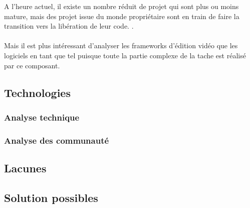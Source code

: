       A l'heure actuel, il existe un nombre réduit de projet qui sont
      plus ou moins mature, mais des projet issue du monde propriétaire
      sont en train de faire la transition vers la libération de leur
      code. \cite{XXXXXXXXX}.

    \paragraph{}
      Mais il est plus intéressant d'analyser les frameworks d'édition
      vidéo  que les logiciels en tant que tel puisque toute la partie
      complexe de la tache est réalisé par ce composant.

  \subsection{Technologies}
    \subsubsection{Analyse technique}
    \subsubsection{Analyse des communauté}
  \subsection{Lacunes}
  \subsection{Solution possibles}

